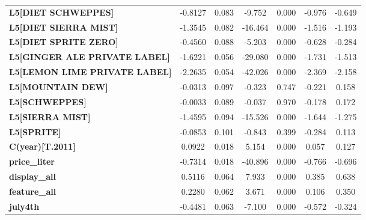 \begin{center}
\begin{tabular}{lcccccc}
\textbf{L5[DIET SCHWEPPES]}                &      -0.8127  &        0.083     &    -9.752  &         0.000        &       -0.976    &       -0.649     \\
\textbf{L5[DIET SIERRA MIST]}              &      -1.3545  &        0.082     &   -16.464  &         0.000        &       -1.516    &       -1.193     \\
\textbf{L5[DIET SPRITE ZERO]}              &      -0.4560  &        0.088     &    -5.203  &         0.000        &       -0.628    &       -0.284     \\
\textbf{L5[GINGER ALE PRIVATE LABEL]}      &      -1.6221  &        0.056     &   -29.080  &         0.000        &       -1.731    &       -1.513     \\
\textbf{L5[LEMON LIME PRIVATE LABEL]}      &      -2.2635  &        0.054     &   -42.026  &         0.000        &       -2.369    &       -2.158     \\
\textbf{L5[MOUNTAIN DEW]}                  &      -0.0313  &        0.097     &    -0.323  &         0.747        &       -0.221    &        0.158     \\
\textbf{L5[SCHWEPPES]}                     &      -0.0033  &        0.089     &    -0.037  &         0.970        &       -0.178    &        0.172     \\
\textbf{L5[SIERRA MIST]}                   &      -1.4595  &        0.094     &   -15.526  &         0.000        &       -1.644    &       -1.275     \\
\textbf{L5[SPRITE]}                        &      -0.0853  &        0.101     &    -0.843  &         0.399        &       -0.284    &        0.113     \\
\textbf{C(year)[T.2011]}                   &       0.0922  &        0.018     &     5.154  &         0.000        &        0.057    &        0.127     \\
\textbf{price\_liter}                      &      -0.7314  &        0.018     &   -40.896  &         0.000        &       -0.766    &       -0.696     \\
\textbf{display\_all}                      &       0.5116  &        0.064     &     7.933  &         0.000        &        0.385    &        0.638     \\
\textbf{feature\_all}                      &       0.2280  &        0.062     &     3.671  &         0.000        &        0.106    &        0.350     \\
\textbf{july4th}                           &      -0.4481  &        0.063     &    -7.100  &         0.000        &       -0.572    &       -0.324     \\

\end{tabular}
\end{center}
